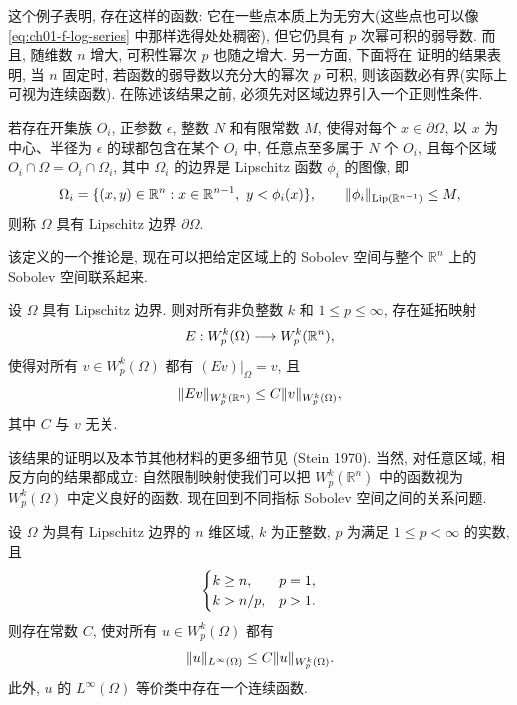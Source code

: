 这个例子表明, 存在这样的函数: 它在一些点本质上为无穷大(这些点也可以像 \eqref{eq:ch01-f-log-series} 中那样选得处处稠密), 但它仍具有 $p$ 次幂可积的弱导数. 而且, 随维数 $n$ 增大, 可积性幂次 $p$ 也随之增大. 另一方面, 下面将在  证明的结果表明, 当 $n$ 固定时, 若函数的弱导数以充分大的幂次 $p$ 可积, 则该函数必有界(实际上可视为连续函数). 在陈述该结果之前, 必须先对区域边界引入一个正则性条件.

\setcounter{thmcount}{3}
\begin{Definition}
\label{def:ch01-lipschitz-boundary}
若存在开集族 $O_i$, 正参数 $\epsilon$, 整数 $N$ 和有限常数 $M$, 使得对每个 $x\in\partial\Omega$, 以 $x$ 为中心、半径为 $\epsilon$ 的球都包含在某个 $O_i$ 中, 任意点至多属于 $N$ 个 $O_i$, 且每个区域 $O_i\cap\Omega=O_i\cap\Omega_i$, 其中 $\Omega_i$ 的边界是 Lipschitz 函数 $\phi_i$ 的图像, 即
\[
\MathBookFormulaID{formula-ch01-lipschitz-graph-domain}
\Omega_i=\{(x,y)\in\mathbb R^n:x\in\mathbb R^{n-1},\ y<\phi_i(x)\},
\qquad\|\phi_i\|_{\operatorname{Lip}(\mathbb R^{n-1})}\leq M,
\]
则称 $\Omega$ 具有 Lipschitz 边界 $\partial\Omega$.
\end{Definition}

该定义的一个推论是, 现在可以把给定区域上的 Sobolev 空间与整个 $\mathbb R^n$ 上的 Sobolev 空间联系起来.

\begin{Theorem}
\label{thm:ch01-extension-mapping}
设 $\Omega$ 具有 Lipschitz 边界. 则对所有非负整数 $k$ 和 $1\leq p\leq\infty$, 存在延拓映射
\[
\MathBookFormulaID{formula-ch01-extension-map}
E:W_p^k(\Omega)\longrightarrow W_p^k(\mathbb R^n),
\]
使得对所有 $v\in W_p^k(\Omega)$ 都有 $(Ev)|_\Omega=v$, 且
\[
\MathBookFormulaID{formula-ch01-extension-bound}
\|Ev\|_{W_p^k(\mathbb R^n)}\leq C\|v\|_{W_p^k(\Omega)},
\]
其中 $C$ 与 $v$ 无关.
\end{Theorem}

该结果的证明以及本节其他材料的更多细节见 (Stein 1970). 当然, 对任意区域, 相反方向的结果都成立: 自然限制映射使我们可以把 $W_p^k(\mathbb R^n)$ 中的函数视为 $W_p^k(\Omega)$ 中定义良好的函数. 现在回到不同指标 Sobolev 空间之间的关系问题.

\setcounter{thmcount}{5}
\begin{Theorem}
\label{thm:ch01-sobolev-inequality}
设 $\Omega$ 为具有 Lipschitz 边界的 $n$ 维区域, $k$ 为正整数, $p$ 为满足 $1\leq p<\infty$ 的实数, 且
\[
\MathBookFormulaID{formula-ch01-sobolev-inequality-conditions}
\begin{cases}
k\geq n,&p=1,\\
k>n/p,&p>1.
\end{cases}
\]
则存在常数 $C$, 使对所有 $u\in W_p^k(\Omega)$ 都有
\[
\MathBookFormulaID{formula-ch01-sobolev-inequality}
\|u\|_{L^\infty(\Omega)}\leq C\|u\|_{W_p^k(\Omega)}.
\]
此外, $u$ 的 $L^\infty(\Omega)$ 等价类中存在一个连续函数.
\end{Theorem}

